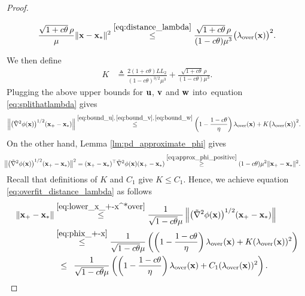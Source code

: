 \documentclass[11pt]{article}
\theoremstyle{plain}
\theoremstyle{definition}
\theoremstyle{remark}
\theoremstyle{plain}
\newcommand{\Norm}[1]{\left\| #1 \right\|}
\def\vv{{\bf{v}}}
\def\vw{{\bf{w}}}
\def\vw {{{\bf w}}}
\def\u{{\bf u}}
\def\x{{\bf x}}
\begin{document}
\begin{proof}
\begin{itemize}
\begin{align}
\begin{split}
\frac{\sqrt{1+c\theta}\,\rho}{\mu}\|\x-\x_*\|^2
\overset{\eqref{eq:distance_lambda}}{\leq}
\frac{\sqrt{1+c\theta}\,\rho}{(1-c\theta)\mu^3}
\bigl(\lambda_{\mathrm{over}}(\x)\bigr)^2.
\end{split}
\end{align}
\end{itemize}
We then define
\begin{align*}
K
&\triangleq\frac{2(1+c\theta)LL_2}{(1-c\theta)^{3/2}\mu^3}
+\frac{\sqrt{1+c\theta}\,\rho}{(1-c\theta)\mu^3}.
\end{align*}
Plugging the above upper bounds for $\u$, $\vv$ and $\vw$ into~equation \eqref{eq:splithatlambda} gives
\begin{align}
\label{eq:phix_+-x}
\Norm{\big(\tilde{\nabla}^2\phi(\x)\big)^{1/2}(\x_{+}-\x_*)}
&\overset{\eqref{eq:bound_u},\,\eqref{eq:bound_v},\,\eqref{eq:bound_w}}{\leq}\left(1-\frac{1-c\theta}{\eta}\right)\lambda_{\mathrm{over}}(\x)
+K\bigl(\lambda_{\mathrm{over}}(\x)\bigr)^2.
\end{align}
On the other hand, Lemma \ref{lm:pd_approximate_phi} gives
\begin{align}
\label{eq:lower_x_+-x^*over}
\!\!\!\big\|\big(\tilde{\nabla}^2\phi(\x)\big)^{1/2}
(\x_{+}-\x_*)\big\|^2
&=(\x_{+}-\x_*)^{\top}\tilde{\nabla}^2\phi(\x)(\x_{+}-\x_*)\overset{\eqref{eq:approx_phi_positive}}{\geq}
(1-c\theta)\mu^2\|\x_{+}-\x_*\|^2.
\end{align}
Recall that definitions of $K$ and $C_1$ give $K\leq C_1$.
Hence, we achieve equation \eqref{eq:overfit_distance_lambda} as follows
\begin{align*}
\|\x_{+}-\x_*\|
&\overset{\eqref{eq:lower_x_+-x^*over}}{\leq}\frac{1}{\sqrt{1-c\theta}\mu}
\Norm{\bigl(\tilde{\nabla}^2\phi(\x)\bigr)^{1/2}
(\x_{+}-\x_*)}\\
&\overset{\eqref{eq:phix_+-x}}{\leq}
\frac{1}{\sqrt{1-c\theta}\mu}
\left(\left(1-\frac{1-c\theta}{\eta}\right)\lambda_{\mathrm{over}}(\x)
+K(\lambda_{\mathrm{over}}(\x))^2\right)\\
&\,~\leq\,~\frac{1}{\sqrt{1-c\theta}\mu}
\left(\left(1-\frac{1-c\theta}{\eta}\right)\lambda_{\mathrm{over}}(\x)
+C_1(\lambda_{\mathrm{over}}(\x))^2\right).
\end{align*}


\end{proof}
\end{document}
